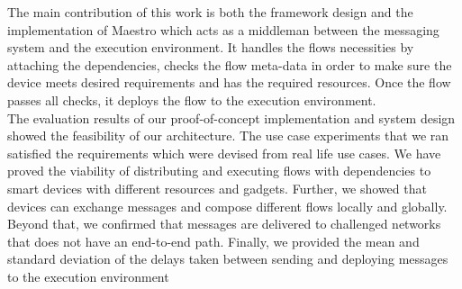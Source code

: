 \noindent The main contribution of this work is both the framework design and the implementation of Maestro which acts as a middleman between the messaging system and the execution environment. It handles the flows necessities by attaching the dependencies, checks the flow meta-data in order to make sure the device meets desired requirements and has the required resources. Once the flow passes all checks, it deploys the flow to the execution environment. \\


\noindent The evaluation results of our  proof-of-concept implementation and system design showed the feasibility of our architecture. The use case experiments that we ran satisfied the  requirements which were devised from  real life use cases. We have proved the viability of distributing and executing flows with dependencies to smart devices with different resources and gadgets. Further, we showed that devices can exchange messages and compose different flows locally and globally. Beyond that, we confirmed that messages are delivered to challenged networks that does not have an end-to-end path. Finally, we provided the mean and standard deviation of the delays taken between sending and deploying messages to the execution environment 



